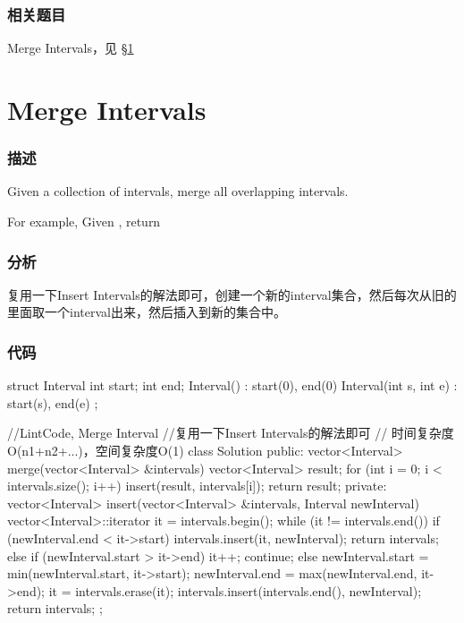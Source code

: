 \subsubsection{相关题目}

\begindot
\item Merge Intervals，见 \S \ref{sec:merge-intervals}
\myenddot


\section{Merge Intervals} %
\label{sec:merge-intervals}


\subsubsection{描述}
Given a collection of intervals, merge all overlapping intervals.

For example,
Given \code{[1,3],[2,6],[8,10],[15,18]},
return \code{[1,6],[8,10],[15,18]}


\subsubsection{分析}
复用一下Insert Intervals的解法即可，创建一个新的interval集合，然后每次从旧的里面取一个interval出来，然后插入到新的集合中。


\subsubsection{代码}
\begin{Code}
struct Interval {
    int start;
    int end;
    Interval() : start(0), end(0) { }
    Interval(int s, int e) : start(s), end(e) { }
};
 
//LintCode, Merge Interval
//复用一下Insert Intervals的解法即可
// 时间复杂度O(n1+n2+...)，空间复杂度O(1)
class Solution {
public:
    vector<Interval> merge(vector<Interval> &intervals) {
        vector<Interval> result;
        for (int i = 0; i < intervals.size(); i++) {
            insert(result, intervals[i]);
        }
        return result;
    }
private:
    vector<Interval> insert(vector<Interval> &intervals, Interval newInterval) {
        vector<Interval>::iterator it = intervals.begin();
        while (it != intervals.end()) {
            if (newInterval.end < it->start) {
                intervals.insert(it, newInterval);
                return intervals;
            } else if (newInterval.start > it->end) {
                it++;
                continue;
            } else {
                newInterval.start = min(newInterval.start, it->start);
                newInterval.end = max(newInterval.end, it->end);
                it = intervals.erase(it);
            }
        }
        intervals.insert(intervals.end(), newInterval);
        return intervals;
    }
};
\end{Code}


